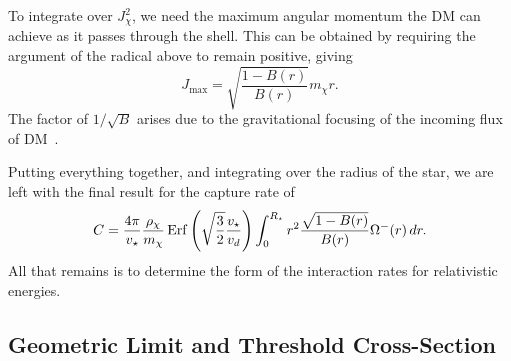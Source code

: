 To integrate over $J^2_\chi$, we need the maximum angular momentum the DM can achieve as it passes through the shell. This can be obtained by requiring the argument of the radical above to remain positive, giving
\begin{equation}
    J_\mathrm{max} = \sqrt{\frac{1 - B(r)}{B(r)}} m_\chi r.
\end{equation}
The factor of $1/\sqrt{B}$ arises due to the gravitational focusing of the incoming flux of DM~\cite{Kouvaris:2007ay_WIMPAnnihilationCooling}.

Putting everything together, and integrating over the radius of the star, we are left with the final result for the capture rate of
\begin{equation}
    C =\frac{4\pi}{v_\star}\frac{\rho_\chi}{m_\chi} {\rm \,Erf}\left(\sqrt{\frac{3}{2}}\frac{v_\star}{v_d}\right) \int_0^{R_\star}  r^2\frac{\sqrt{1 - B(r)}}{B(r)}\Omega^-(r)\,dr.
    \label{ch3:eq:cap_rel_full_1}
\end{equation}
All that remains is to determine the form of the interaction rates for relativistic energies.


\subsection{Geometric Limit and Threshold Cross-Section}
\label{ch3:subsec:geom_lim_threshold_xs}


